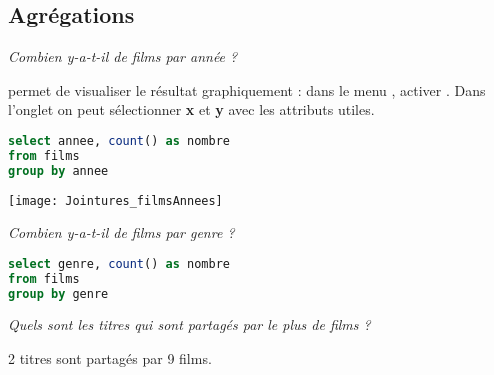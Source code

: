 \subsection{Agrégations} 
\begin{Exercise} \it 
Combien y-a-t-il de films par année ?

 permet de visualiser le résultat graphiquement : dans le menu , activer . Dans l'onglet  on peut sélectionner {\bf x} et {\bf y} avec les attributs utiles.
\end{Exercise}
\begin{Answer}
\begin{lstlisting}[language=SQL]
select annee, count() as nombre
from films
group by annee
\end{lstlisting}
\end{Answer}
\begin{center}
    \texttt{[image: Jointures\_filmsAnnees]}
  \end{center}
\begin{Exercise} \it 
Combien y-a-t-il de films par genre ?
\end{Exercise}
\begin{Answer}
\begin{lstlisting}[language=SQL]
select genre, count() as nombre
from films
group by genre
\end{lstlisting}
\end{Answer}
\begin{Exercise} \it Quels sont les titres qui sont partagés par le plus de films ? 

2 titres sont partagés par 9 films.
\end{Exercise}
